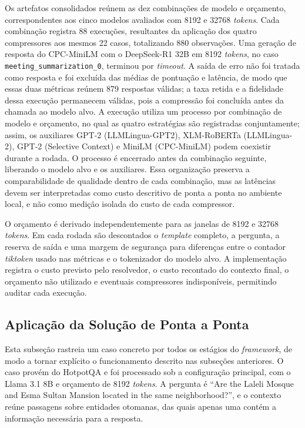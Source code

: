Os artefatos consolidados reúnem as dez combinações de modelo e orçamento, correspondentes aos cinco modelos avaliados com 8192 e 32768 \textit{tokens}. Cada combinação registra 88 execuções, resultantes da aplicação dos quatro compressores aos mesmos 22 casos, totalizando 880 observações. Uma geração de resposta do CPC-MiniLM com o DeepSeek-R1 32B em 8192 \textit{tokens}, no caso \texttt{meeting\_summarization\_0}, terminou por \textit{timeout}. A saída de erro não foi tratada como resposta e foi excluída das médias de pontuação e latência, de modo que essas duas métricas reúnem 879 respostas válidas; a taxa retida e a fidelidade dessa execução permanecem válidas, pois a compressão foi concluída antes da chamada ao modelo alvo. A execução utiliza um processo por combinação de modelo e orçamento, no qual as quatro estratégias são registradas conjuntamente; assim, os auxiliares GPT-2 (LLMLingua-GPT2), XLM-RoBERTa (LLMLingua-2), GPT-2 (Selective Context) e MiniLM (CPC-MiniLM) podem coexistir durante a rodada. O processo é encerrado antes da combinação seguinte, liberando o modelo alvo e os auxiliares. Essa organização preserva a comparabilidade de qualidade dentro de cada combinação, mas as latências devem ser interpretadas como custo descritivo de ponta a ponta no ambiente local, e não como medição isolada do custo de cada compressor.

O orçamento é derivado independentemente para as janelas de 8192 e 32768 \textit{tokens}. Em cada rodada são descontados o \textit{template} completo, a pergunta, a reserva de saída e uma margem de segurança para diferenças entre o contador \textit{tiktoken} usado nas métricas e o tokenizador do modelo alvo. A implementação registra o custo previsto pelo resolvedor, o custo recontado do contexto final, o orçamento não utilizado e eventuais compressores indisponíveis, permitindo auditar cada execução.

\subsection{Aplicação da Solução de Ponta a Ponta}
\label{subsec:aplicacao}

Esta subseção rastreia um caso concreto por todos os estágios do \textit{framework}, de modo a tornar explícito o funcionamento descrito nas subseções anteriores. O caso provém do HotpotQA e foi processado sob a configuração principal, com o Llama 3.1 8B e orçamento de 8192 \textit{tokens}. A pergunta é ``Are the Laleli Mosque and Esma Sultan Mansion located in the same neighborhood?'', e o contexto reúne passagens sobre entidades otomanas, das quais apenas uma contém a informação necessária para a resposta.

